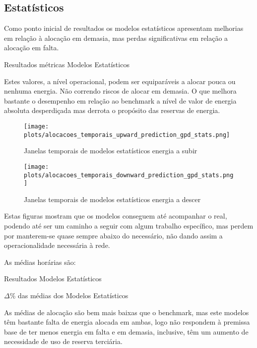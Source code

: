 \subsection{Estatísticos \label{se:resstats}}
Como ponto inicial de resultados os modelos estatísticos apresentam melhorias em relação à alocação em demasia, mas perdas significativas em relação a alocação em falta.\par

\begin{table}[H]
    \caption{Resultados métricas Modelos Estatísticos}    
    \resizebox{\linewidth}{!}{}
    \label{tab:statsmetrics}
    \end{table}

Estes valores, a nível operacional, podem ser equiparáveis a alocar pouca ou nenhuma energia. Não correndo riscos de alocar em demasia. O que melhora bastante o desempenho em relação ao benchmark a nível de valor de energia absoluta desperdiçada mas derrota o propósito das reservas de energia.\par

\begin{figure}[H]
    \centering
    \texttt{[image: plots/alocacoes\_temporais\_upward\_prediction\_gpd\_stats.png]}
    \caption{Janelas temporais de modelos estatísticos energia a subir}
    \label{fig:statstimewindowsup}
\end{figure}


\begin{figure}[H]
    \centering
    \texttt{[image: plots/alocacoes\_temporais\_downward\_prediction\_gpd\_stats.png]}
    \caption{Janelas temporais de modelos estatísticos energia a descer}
    \label{fig:statstimewindowsdown}
\end{figure}

Estas figuras mostram que os modelos conseguem até acompanhar o real, podendo até ser um caminho a seguir com algum trabalho específico, mas perdem por manterem-se quase sempre abaixo do necessário, não dando assim a operacionalidade necessária à rede.\par
As médias horárias são:\\
\begin{table}[H]
    \centering
    \resizebox{0.8\linewidth}{!}{}
    \caption{Resultados Modelos Estatísticos}
    \label{tab:statsres}
    \end{table}



\begin{table}[H]
    \centering
    \resizebox{\linewidth}{!}{}
    \caption{$\Delta$\% das médias dos Modelos Estatísticos}    
    \label{tab:statsres_deltas}
    \end{table}

As médias de alocação são bem mais baixas que o benchmark, mas este modelos têm bastante falta de energia alocada em ambas, logo não respondem à premissa base de ter menos energia em falta e em demasia, inclusive, têm um aumento de necessidade de uso de reserva terciária.\par

